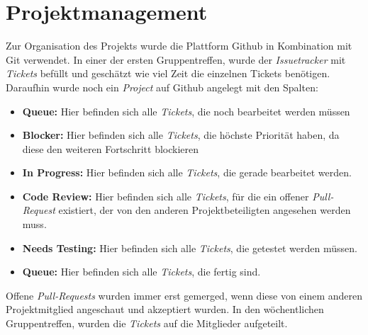 \documentclass{mi-seminar}
\begin{document}
\section{Projektmanagement}
Zur Organisation des Projekts wurde die Plattform Github in Kombination mit Git verwendet. In einer der ersten Gruppentreffen, wurde der \textit{Issuetracker} mit \textit{Tickets} befüllt und geschätzt wie viel Zeit die einzelnen Tickets benötigen. 
Daraufhin wurde noch ein \textit{Project} auf Github angelegt mit den Spalten:
\begin{itemize}
\item \textbf{Queue: } Hier befinden sich alle \textit{Tickets}, die noch bearbeitet werden müssen
\item \textbf{Blocker: } Hier befinden sich alle \textit{Tickets}, die höchste Priorität haben, da diese den weiteren Fortschritt blockieren
\item \textbf{In Progress: } Hier befinden sich alle \textit{Tickets}, die gerade bearbeitet werden.
\item \textbf{Code Review: } Hier befinden sich alle \textit{Tickets}, für die ein offener \textit{Pull-Request} existiert, der von den anderen Projektbeteiligten angesehen werden muss.
\item \textbf{Needs Testing: } Hier befinden sich alle \textit{Tickets}, die getestet werden müssen.
\item \textbf{Queue: } Hier befinden sich alle \textit{Tickets}, die fertig sind.
\newline \newline
\end{itemize}
Offene \textit{Pull-Requests} wurden immer erst gemerged, wenn diese von einem anderen Projektmitglied angeschaut und akzeptiert wurden. 
In den wöchentlichen Gruppentreffen, wurden die \textit{Tickets}
auf die Mitglieder aufgeteilt.
\end{document}
